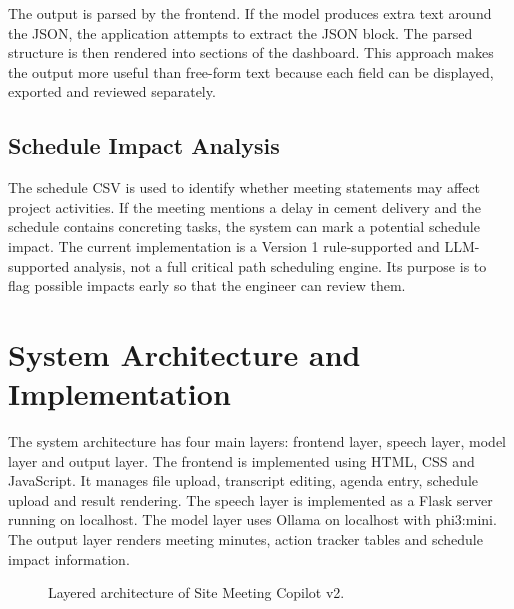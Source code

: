 \documentclass[11pt,a4paper]{article}
\begin{document}
The output is parsed by the frontend. If the model produces extra text around the JSON, the application attempts to extract the JSON block. The parsed structure is then rendered into sections of the dashboard. This approach makes the output more useful than free-form text because each field can be displayed, exported and reviewed separately.

\subsection{Schedule Impact Analysis}

The schedule CSV is used to identify whether meeting statements may affect project activities. If the meeting mentions a delay in cement delivery and the schedule contains concreting tasks, the system can mark a potential schedule impact. The current implementation is a Version 1 rule-supported and LLM-supported analysis, not a full critical path scheduling engine. Its purpose is to flag possible impacts early so that the engineer can review them.

\section{System Architecture and Implementation}

The system architecture has four main layers: frontend layer, speech layer, model layer and output layer. The frontend is implemented using HTML, CSS and JavaScript. It manages file upload, transcript editing, agenda entry, schedule upload and result rendering. The speech layer is implemented as a Flask server running on localhost. The model layer uses Ollama on localhost with phi3:mini. The output layer renders meeting minutes, action tracker tables and schedule impact information.

\begin{figure}[H]
\centering
{}
\caption{Layered architecture of Site Meeting Copilot v2.}
\end{figure}
\end{document}
